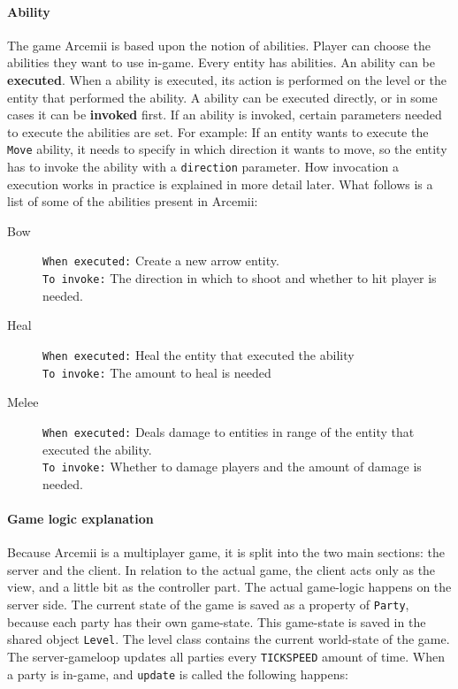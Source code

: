 \documentclass[../main.tex]{subfiles}
\begin{document}
        \paragraph{Ability}
        The game Arcemii is based upon the notion of abilities. Player can choose the abilities they want to use in-game. Every entity has abilities. An ability can be \textbf{executed}. When a ability is executed, its action is performed on the level or the entity that performed the ability. A ability can be executed directly, or in some cases it can be \textbf{invoked} first. If an ability is invoked, certain parameters needed to execute the abilities are set. For example: If an entity wants to execute the \texttt{Move} ability, it needs to specify in which direction it wants to move, so the entity has to invoke the ability with a \texttt{direction} parameter. How invocation a execution works in practice is explained in more detail later. What follows is a list of some of the abilities present in Arcemii:
        \begin{description}
            \item[Bow] \texttt{When executed:} Create a new arrow entity. \\
            \texttt{To invoke:} The direction in which to shoot and whether to hit player is needed.
            \item[Heal] \texttt{When executed:} Heal the entity that executed the ability \\
            \texttt{To invoke:} The amount to heal is needed
            \item[Melee] \texttt{When executed:} Deals damage to entities in range of the entity that executed the ability.\\
            \texttt{To invoke:} Whether to damage players and the amount of damage is needed.
        \end{description}

        \paragraph{Game logic explanation}
        Because Arcemii is a multiplayer game, it is split into the two main sections: the server and the client. In relation to the actual game, the client acts only as the view, and a little bit as the controller part. The actual game-logic happens on the server side. The current state of the game is saved as a property of \texttt{Party}, because each party has their own game-state. This game-state is saved in the shared object \texttt{Level}. The level class contains the current world-state of the game. The server-gameloop updates all parties every \texttt{TICKSPEED} amount of time. When a party is in-game, and \texttt{update} is called the following happens:
\end{document}

